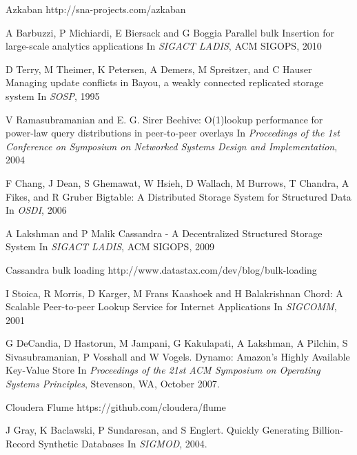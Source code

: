 \documentclass[10pt,twocolumn,preprint,natbib,authoryear]{sigplanconf}
\begin{document}
\begin{thebibliography}
\softraggedright

Azkaban
\newblock http://sna-projects.com/azkaban

A Barbuzzi, P Michiardi, E Biersack and G Boggia
\newblock Parallel bulk Insertion for large-scale analytics applications
\newblock In
\emph{SIGACT LADIS}, ACM SIGOPS, 2010

D Terry, M Theimer, K Petersen, A Demers, M Spreitzer, and C Hauser
\newblock Managing update conflicts in Bayou, a weakly connected replicated storage system
\newblock In
\emph{SOSP}, 1995

V Ramasubramanian and E. G. Sirer
\newblock Beehive: O(1)lookup performance for power-law query distributions in peer-to-peer overlays
\newblock In
\emph{Proceedings of the 1st Conference on Symposium on Networked Systems Design and Implementation}, 2004

F Chang, J Dean, S Ghemawat, W Hsieh, D Wallach, M Burrows, T Chandra, A Fikes, and R Gruber
\newblock Bigtable: A Distributed Storage System for Structured Data
\newblock In
\emph{OSDI}, 2006

A Lakshman and P Malik
\newblock Cassandra - A Decentralized Structured Storage System
\newblock In
\emph{SIGACT LADIS}, ACM SIGOPS, 2009

Cassandra bulk loading
\newblock http://www.datastax.com/dev/blog/bulk-loading

I Stoica, R Morris, D Karger, M Frans Kaashoek and H Balakrishnan
\newblock Chord: A Scalable Peer-to-peer Lookup Service for Internet Applications
\newblock In
\emph{SIGCOMM}, 2001

G DeCandia, D Hastorun, M Jampani, G Kakulapati, A Lakshman, A Pilchin, S Sivasubramanian, P Vosshall and W Vogels.
\newblock Dynamo: Amazon's Highly Available Key-Value Store
\newblock In 
\emph{Proceedings of the 21st ACM Symposium on Operating Systems Principles}, Stevenson, WA, October 2007.

Cloudera Flume
\newblock https://github.com/cloudera/flume

J Gray, K Baclawski, P Sundaresan, and S Englert.
\newblock Quickly Generating Billion-Record Synthetic Databases
\newblock In 
\emph{SIGMOD}, 2004.



\end{thebibliography}
\end{document}
